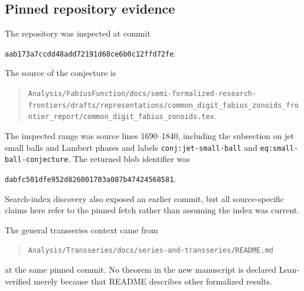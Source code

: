 \documentclass[11pt,a4paper]{article}
\numberwithin{equation}{section}
\theoremstyle{definition}
\newcommand{\sourcecommit}{\texttt{aab173a7ccdd48add72191d68ce6b0c12ffd72fe}}
\begin{document}
\subsection{Pinned repository evidence}
The repository was inspected at commit
\begin{center}\small\sourcecommit.\end{center}
The source of the conjecture is
\begin{quote}\small\raggedright
\nolinkurl{Analysis/FabiusFunction/docs/semi-formalized-research-frontiers/drafts/representations/common_digit_fabius_zonoids_frontier_report/common_digit_fabius_zonoids.tex}.
\end{quote}
The inspected range was source lines 1690--1840, including the subsection on jet small balls and Lambert phases and labels \texttt{conj:jet-small-ball} and \texttt{eq:small-ball-conjecture}. The returned blob identifier was
\begin{center}\small\texttt{dabfc501dfe952d826001703a087b47424568581}.\end{center}
Search-index discovery also exposed an earlier commit, but all source-specific claims here refer to the pinned fetch rather than assuming the index was current.

The general transseries context came from
\begin{quote}\small\raggedright
\nolinkurl{Analysis/Transseries/docs/series-and-transseries/README.md}
\end{quote}
at the same pinned commit. No theorem in the new manuscript is declared Lean-verified merely because that README describes other formalized results.
\end{document}
